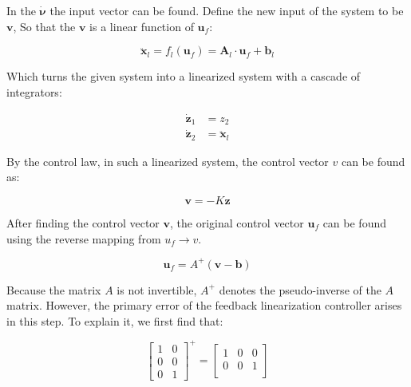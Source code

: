 In the $\dot{\boldsymbol{\nu}}$ the input vector can be found. Define the new input of the system to be $\boldsymbol{v}$, So that the $\boldsymbol{v}$ is a linear function of $\boldsymbol{u}_f$:

\begin{equation}
    \ddot{\boldsymbol{x}}_l=f_l(\boldsymbol{u}_f)=\boldsymbol{A}_l\cdot\boldsymbol{u}_f+\boldsymbol{b}_l
\end{equation}

Which turns the given system into a linearized system with a cascade of integrators:

\begin{equation}
    \begin{split}
        \dot{\boldsymbol{z}}_1 &= z_2 \\
        \dot{\boldsymbol{z}}_2 &= \ddot{\boldsymbol{x}}_l
    \end{split}
\end{equation}

By the control law, in such a linearized system, the control vector $v$ can be found as:

\begin{equation}
    \boldsymbol{v}=-K\boldsymbol{z}
\end{equation}

After finding the control vector $\boldsymbol{v}$, the original control vector $\boldsymbol{u}_f$ can be found using the reverse mapping from $u_f\rightarrow v$.

\begin{equation}
    \boldsymbol{u}_f=A^+(\boldsymbol{v}-\boldsymbol{b})
\end{equation}

Because the matrix $A$ is not invertible, $A^+$ denotes the pseudo-inverse of the $A$ matrix. However, the primary error of the feedback linearization controller arises in this step. To explain it, we first find that:

\begin{equation}
    \left[\begin{array}{cc}
        1 & 0 \\
        0 & 0 \\
        0 & 1
    \end{array}\right]^+=\left[\begin{array}{ccc}
        1 & 0 & 0\\
        0 & 0 & 1\\
    \end{array}\right]
\end{equation}

